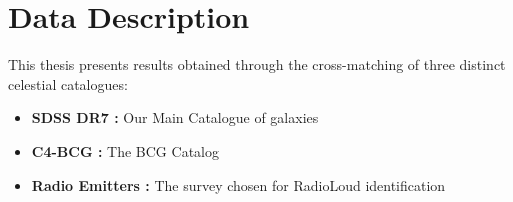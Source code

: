 \section{Data Description}
This thesis presents results obtained through the cross-matching of three distinct celestial catalogues:
\begin{itemize}
	\item\textbf{SDSS DR7 :} Our Main Catalogue of galaxies
	\item \textbf{C4-BCG :} The BCG Catalog 
	\item \textbf{Radio Emitters :}  The survey chosen for RadioLoud identification
\end{itemize}

